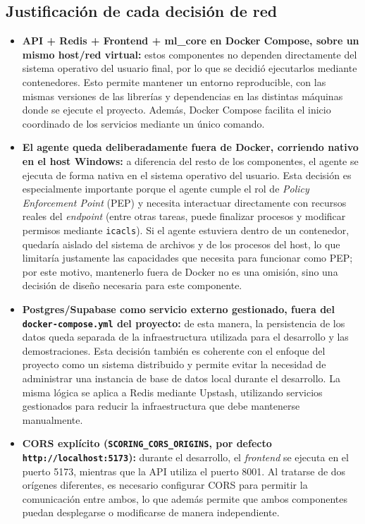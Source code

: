 \subsection{Justificación de cada decisión de red}
\begin{itemize}
	\item \textbf{API + Redis + Frontend + ml\_core en Docker Compose, sobre un mismo host/red virtual:} estos componentes no dependen directamente del sistema operativo del usuario final, por lo que se decidió ejecutarlos mediante contenedores. Esto permite mantener un entorno reproducible, con las mismas versiones de las librerías y dependencias en las distintas máquinas donde se ejecute el proyecto. Además, Docker Compose facilita el inicio coordinado de los servicios mediante un único comando.
	\item \textbf{El agente queda deliberadamente fuera de Docker, corriendo nativo en el host Windows:} a diferencia del resto de los componentes, el agente se ejecuta de forma nativa en el sistema operativo del usuario. Esta decisión es especialmente importante porque el agente cumple el rol de \emph{Policy Enforcement Point} (PEP) y necesita interactuar directamente con recursos reales del \emph{endpoint} (entre otras tareas, puede finalizar procesos y modificar permisos mediante \texttt{icacls}). Si el agente estuviera dentro de un contenedor, quedaría aislado del sistema de archivos y de los procesos del host, lo que limitaría justamente las capacidades que necesita para funcionar como PEP; por este motivo, mantenerlo fuera de Docker no es una omisión, sino una decisión de diseño necesaria para este componente.
	\item \textbf{Postgres/Supabase como servicio externo gestionado, fuera del \texttt{docker-compose.yml} del proyecto:} de esta manera, la persistencia de los datos queda separada de la infraestructura utilizada para el desarrollo y las demostraciones. Esta decisión también es coherente con el enfoque del proyecto como un sistema distribuido y permite evitar la necesidad de administrar una instancia de base de datos local durante el desarrollo. La misma lógica se aplica a Redis mediante Upstash, utilizando servicios gestionados para reducir la infraestructura que debe mantenerse manualmente.
	\item \textbf{CORS explícito (\texttt{SCORING\_CORS\_ORIGINS}, por defecto \texttt{http://localhost:5173}):} durante el desarrollo, el \emph{frontend} se ejecuta en el puerto 5173, mientras que la API utiliza el puerto 8001. Al tratarse de dos orígenes diferentes, es necesario configurar CORS para permitir la comunicación entre ambos, lo que además permite que ambos componentes puedan desplegarse o modificarse de manera independiente.

\end{itemize}
